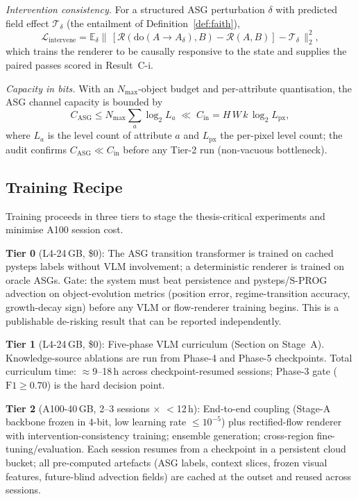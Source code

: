 \documentclass[fleqn,10pt]{wlscirep}
\begin{document}
\emph{Intervention consistency.} For a structured ASG perturbation $\delta$ with predicted field effect $\mathcal{T}_\delta$ (the entailment of Definition~\ref{def:faith}),
\begin{equation}
\mathcal{L}_\text{intervene} = \mathbb{E}_{\delta}\big\|\,[\mathcal{R}(\mathrm{do}(A\!\to\!A_\delta),B)-\mathcal{R}(A,B)] - \mathcal{T}_\delta\,\big\|_2^2 ,
\label{eq:intervene}
\end{equation}
which trains the renderer to be causally responsive to the state and supplies the paired passes scored in Result~C-i.

\emph{Capacity in bits.} With an $N_\text{max}$-object budget and per-attribute quantisation, the ASG channel capacity is bounded by
\begin{equation}
C_\text{ASG} \le N_\text{max}\sum_{a}\log_2 L_a \;\ll\; C_\text{in} = H\,W\,k\,\log_2 L_\text{px},
\label{eq:capbits}
\end{equation}
where $L_a$ is the level count of attribute $a$ and $L_\text{px}$ the per-pixel level count; the audit confirms $C_\text{ASG}\ll C_\text{in}$ before any Tier-2 run (non-vacuous bottleneck).

\subsection*{Training Recipe}

Training proceeds in three tiers to stage the thesis-critical experiments and minimise A100 session cost.

\textbf{Tier 0} (L4-24\,GB, \$0): The ASG transition transformer is trained on cached pysteps labels without VLM involvement; a deterministic renderer is trained on oracle ASGs.
Gate: the system must beat persistence and pysteps/S-PROG advection on object-evolution metrics (position error, regime-transition accuracy, growth-decay sign) before any VLM or flow-renderer training begins.
This is a publishable de-risking result that can be reported independently.

\textbf{Tier 1} (L4-24\,GB, \$0): Five-phase VLM curriculum (Section on Stage~A).
Knowledge-source ablations are run from Phase-4 and Phase-5 checkpoints.
Total curriculum time: $\approx$9--18\,h across checkpoint-resumed sessions; Phase-3 gate ($\text{F1}\ge 0.70$) is the hard decision point.

\textbf{Tier 2} (A100-40\,GB, 2--3 sessions $\times$ $<$12\,h): End-to-end coupling (Stage-A backbone frozen in 4-bit, low learning rate $\le$$10^{-5}$) plus rectified-flow renderer with intervention-consistency training; ensemble generation; cross-region fine-tuning/evaluation.
Each session resumes from a checkpoint in a persistent cloud bucket; all pre-computed artefacts (ASG labels, context slices, frozen visual features, future-blind advection fields) are cached at the outset and reused across sessions.
\end{document}
